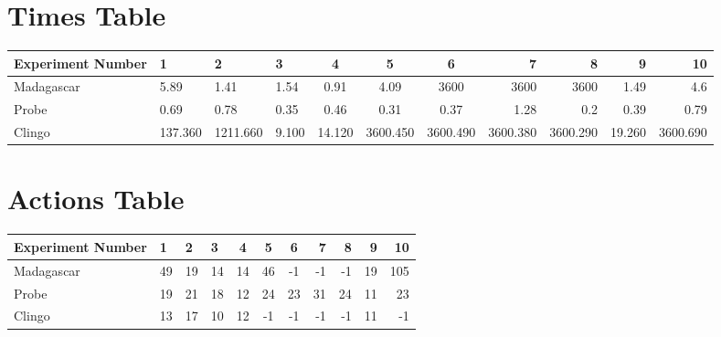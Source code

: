 \documentclass[8pt]{article}
\begin{document}
\begin{landscape}
\section{Times Table}\begin{tabular}{ | l | l | l | l | c | c | c | r | r | r | r | }\hline
Experiment Number & 1 & 2 & 3 & 4 & 5 & 6 & 7 & 8 & 9 & 10\\  \hline
Madagascar & 5.89 & 1.41 & 1.54 & 0.91 & 4.09 & 3600 & 3600 & 3600 & 1.49 & 4.6\\  \hline
Probe & 0.69 & 0.78 & 0.35 & 0.46 & 0.31 & 0.37 & 1.28 & 0.2 & 0.39 & 0.79\\  \hline
Clingo & 137.360 & 1211.660 & 9.100 & 14.120 & 3600.450 & 3600.490 & 3600.380 & 3600.290 & 19.260 & 3600.690\\  \hline
\end{tabular}
\section{Actions Table}\begin{tabular}{ | l | l | l | l | c | c | c | r | r | r | r | }\hline
Experiment Number & 1 & 2 & 3 & 4 & 5 & 6 & 7 & 8 & 9 & 10\\ \hline
 Madagascar & 49 & 19 & 14 & 14 & 46 & -1 & -1 & -1 & 19 & 105\\ \hline
 Probe & 19 & 21 & 18 & 12 & 24 & 23 & 31 & 24 & 11 & 23\\ \hline
 Clingo & 13 & 17 & 10 & 12 & -1 & -1 & -1 & -1 & 11 & -1\\ \hline
\end{tabular}
\end{landscape}
\end{document}
